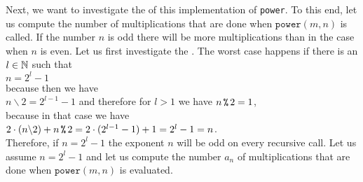 Next, we want to investigate the  of this implementation of \texttt{power}.
To this end, let us compute the number of multiplications that are done when
$\mathtt{power}(m,n)$ is called.  If the number $n$ is odd there will be more multiplications than
in the case when $n$ is even.  Let us first investigate the .  
The worst case happens if there is an $l\in {\mathbb N}$ such that 
\\[0.2cm]
\hspace*{1.3cm}
$n = 2^l - 1$ 
\\[0.2cm]
because then we have 
\\[0.2cm]
\hspace*{1.3cm} $n \backslash 2 = 2^{l-1} - 1$ \quad and therefore for $l > 1$ we have \quad $n \,\texttt{\symbol{37}}\, 2 = 1$, \\[0.2cm]
because in that case we have 
\\[0.2cm]
\hspace*{1.3cm}
$2 \cdot(n \backslash 2) + n \,\texttt{\symbol{37}}\, 2 = 2 \cdot (2^{l-1} - 1) + 1 = 2^l - 1 = n$.
\\[0.2cm]
Therefore, if $n = 2^l - 1$ the exponent $n$ will be odd on every recursive call.
Let us assume $n = 2^l - 1$ and let us compute the number $a_n$ of multiplications that
are done when $\mathtt{power}(m,n)$ is evaluated. 

